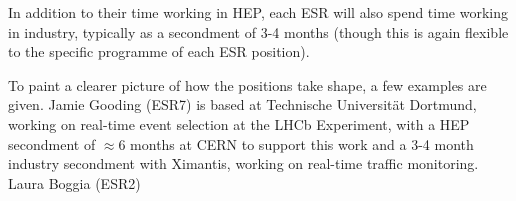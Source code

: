 In addition to their time working in HEP, each ESR will also spend time working in industry, typically as a secondment of 3-4 months (though this is again flexible to the specific programme of each ESR position).\par

To paint a clearer picture of how the positions take shape, a few examples are given. Jamie Gooding (ESR7) is based at Technische Universität Dortmund, working on real-time event selection at the LHCb Experiment, with a HEP secondment of $\approx 6$ months at CERN to support this work and a 3-4 month industry secondment with Ximantis, working on real-time traffic monitoring. Laura Boggia (ESR2)  \par